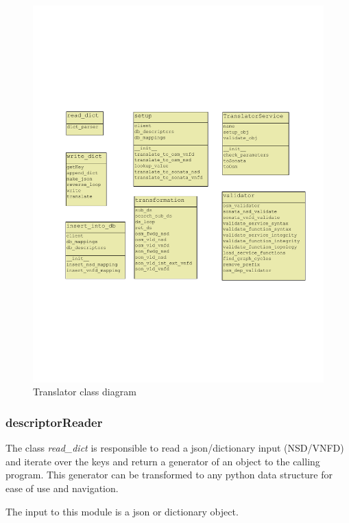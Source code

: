 \begin{figure}[h!]
	\centering
	\includegraphics[width=1\linewidth]{"figures/class_diagram_translator"}
	\caption{Translator class diagram}
	\label{fig:class-diagram-translator}
\end{figure}



\subsubsection{descriptorReader}
The class \textit{read\_dict} is responsible to read a json/dictionary input (NSD/VNFD) and iterate over the keys and return a generator of an object to the calling program. This generator can be transformed to any python data structure for ease of use and navigation. 

The input to this module is a json or dictionary object.

